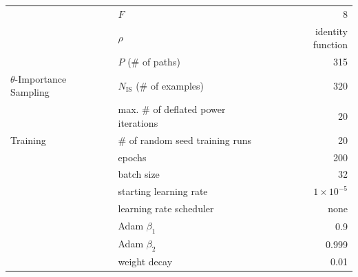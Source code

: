 \documentclass{article} %
\theoremstyle{plain}
\theoremstyle{definition}
\theoremstyle{remark}
\begin{document}
\begin{table}[H]
\begin{tabular}{
    llr
}
    & $F$ & 8 \\
    & $\rho$ & identity function \\
    & $P$ (\# of paths) & 315 \\
    \midrule
    $\theta$-Importance Sampling & $N_{\mathrm{IS}}$ (\# of examples) & 320 \\
    & max. \# of deflated power iterations & 20 \\
    \midrule
    Training & \# of random seed training runs & 20 \\
    & epochs & 200 \\
    & batch size & 32 \\
    & starting learning rate & $1 \times 10^{-5}$ \\
    & learning rate scheduler & none \\
    & Adam $\beta_1$ & 0.9 \\
    & Adam $\beta_2$ & 0.999 \\
    & weight decay & 0.01 \\
    \bottomrule
\end{tabular}
\end{table}

\clearpage
\end{document}
